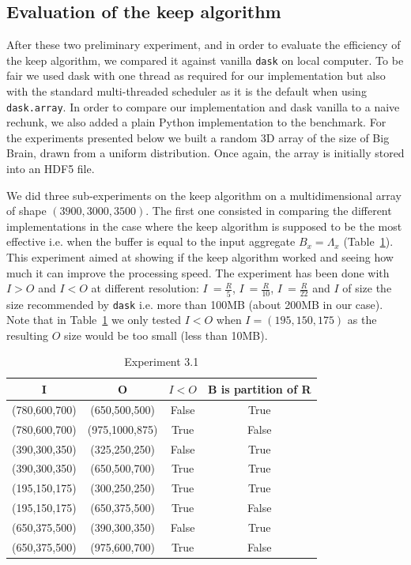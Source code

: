 \documentclass[conference]{IEEEtran}
\begin{document}
\subsection{Evaluation of the keep algorithm}
After these two preliminary experiment, and in order to evaluate the
efficiency of the keep algorithm, we compared it against vanilla \texttt{dask}
on local computer. To be fair we used dask with one thread as required for our
implementation but also with the standard multi-threaded scheduler as it is the
default when using \texttt{dask.array}. In order to compare our implementation
and dask vanilla to a naive rechunk, we also added a plain Python implementation
to the benchmark. For the experiments presented below we built a random 3D array
 of the size of Big Brain, drawn from a uniform distribution. Once again, the
 array is initially stored into an HDF5 file.

We did three sub-experiments on the keep algorithm on a multidimensional array
of shape $(3900,3000,3500)$. The first one consisted in comparing the different
implementations in the case where the keep algorithm is supposed to be the most
effective i.e. when the buffer is equal to the input aggregate $B_x=\Lambda_x$
(Table~\ref{tab:exp3_1}). This experiment aimed at showing if the keep
algorithm worked and seeing how much it can improve the processing speed.
The experiment has been done with $I>O$ and $I<O$ at different resolution:
$I~=\frac{R}{5}$, $I~=\frac{R}{10}$, $I~=\frac{R}{22}$ and $I$ of size the size
recommended by \texttt{dask} i.e. more than 100MB (about 200MB in our case).
Note that in Table~\ref{tab:exp3_1} we only tested $I<O$ when $I=(195,150,175)$
as the resulting $O$ size would be too small (less than 10MB).

\begin{table}[ht]
 \centering
 \caption{Experiment 3.1}

  \begin{tabular}[t]{c c c c}
  \hline
    I & O & $I<O$ & B is partition of R \\
    \hline\hline
    (780,600,700) & (650,500,500) & False & True \\
    \hline
    (780,600,700) & (975,1000,875) & True & False \\
    \hline
    (390,300,350) & (325,250,250) & False & True \\
    \hline
    (390,300,350) & (650,500,700) & True & True \\
    \hline
    (195,150,175) & (300,250,250) & True & True \\
    \hline
    (195,150,175) & (650,375,500) & True & False \\
    \hline
    (650,375,500) & (390,300,350) & False & True \\
    \hline
    (650,375,500) & (975,600,700) & True & False \\
    \hline
  \end{tabular}

  \label{tab:exp3_1}
\end{table}
\end{document}
